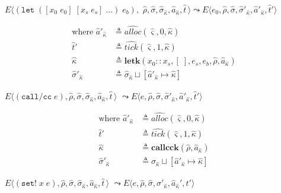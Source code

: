 \documentclass[12pt,draft]{article}
\newcommand{\callccsyn}[1]{(\texttt{call/cc}\;#1)}
\newcommand{\setsyn}[2]{(\texttt{set!}\;#1\;#2)}
\begin{document}
{\begin{multicols*}{2}
\begin{center}
\end{center}
\begin{center}
  $E\langle
  (\texttt{let}\;([x_0\;e_0]\;[x_s\;e_s]\;...)\;e_b),$
  $\hat{\rho}  , \hat{\sigma} , \hat{\sigma}_{\hat{\kappa}} , \hat{a}_{\hat{\kappa}} , \hat{t}\,\rangle
  \leadsto E\langle e_0 , \hat{\rho}  , \hat{\sigma} , \hat{\sigma}'_{\hat{\kappa}} , \hat{a}'_{\hat{\kappa}} , \hat{t}'\rangle$
\end{center}
\vspace{-6mm}
\begin{align*}
  \text{where } \hat{a}'_{\hat{\kappa}} &\triangleq \widehat{alloc}(\hat{\varsigma}, 0, \hat{\kappa}) \\
  \hat{t}' &\triangleq \widehat{tick}(\hat{\varsigma}, 1, \hat{\kappa}) \\
  \hat{\kappa} &\triangleq \textbf{letk}(x_0::x_s, [\;], e_s, e_b, \hat{\rho}, \hat{a}_{\hat{\kappa}}) \\
  \hat{\sigma}'_{\hat{\kappa}} &\triangleq \hat{\sigma}_{\hat{\kappa}} \sqcup [\hat{a}'_{\hat{\kappa}} \mapsto \hat{\kappa}]
\end{align*}
\begin{center}
  $E\langle \callccsyn{e} , \hat{\rho} , \hat{\sigma} , \hat{\sigma}_{\hat{\kappa}} , \hat{a}_{\hat{\kappa}} , \hat{t}\,\rangle$
  $\leadsto E\langle e , \hat{\rho} , \hat{\sigma} , \hat{\sigma}'_{\hat{\kappa}} , \hat{a}'_{\hat{\kappa}} , \hat{t}'\rangle$
\end{center}
\vspace{-4mm}
\begin{align*}
  \text{where } \hat{a}'_{\hat{\kappa}} &\triangleq \widehat{alloc}(\hat{\varsigma}, 0, \hat{\kappa}) \\
  \hat{t}' &\triangleq \widehat{tick}(\hat{\varsigma}, 1, \hat{\kappa}) \\
  \hat{\kappa} &\triangleq \textbf{callcck}(\hat{\rho}, \hat{a}_{\hat{\kappa}}) \\
  \hat{\sigma}'_{\hat{\kappa}} &\triangleq \hat{\sigma}_{\hat{\kappa}} \sqcup [\hat{a}'_{\hat{\kappa}} \mapsto \hat{\kappa}]
\end{align*}
\begin{center}
  $E\langle \setsyn{x}{e} , \hat{\rho} , \hat{\sigma} , \hat{\sigma}_{\hat{\kappa}} , \hat{a}_{\hat{\kappa}} , \hat{t}\,\rangle$
  $\leadsto E\langle e , \hat{\rho} , \hat{\sigma} , \hat{\sigma}'_{\hat{\kappa}} , \hat{a}_{\hat{\kappa}}' , \hat{t}'\rangle$

\end{center}
\end{multicols*}}
\end{document}
